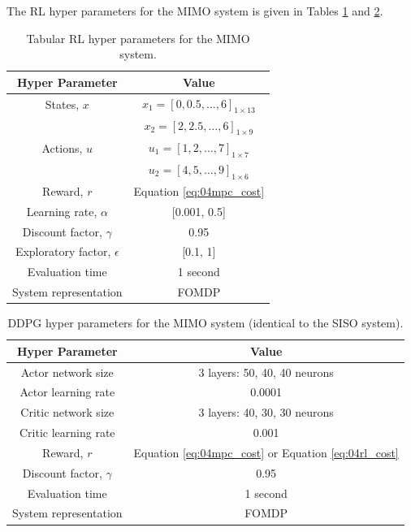 The RL hyper parameters for the MIMO system is given in Tables \ref{tab:04tab_rl_mimo} and \ref{tab:04deep_rl_mimo}.
\begin{table}[H]
\caption{Tabular RL hyper parameters for the MIMO system.}
\label{tab:04tab_rl_mimo}
\centering
\begin{tabular}{c|c}
\textbf{Hyper Parameter}     & \textbf{Value}  \\
\hline
States, $x$	             	& $x_1 = [0, 0.5, ..., 6]_{1 \times 13} $		 \\
        	             	& $x_2 = [2, 2.5, ..., 6]_{1 \times 9} $		 \\
Actions, $u$                & $u_1 = [1, 2, ..., 7]_{1 \times 7}$	         \\
                            & $u_2 = [4, 5, ..., 9]_{1 \times 6}$		\\
Reward, $r$	                & Equation \ref{eq:04mpc_cost}		\\
Learning rate, $\alpha$		& [0.001, 0.5]		 \\
Discount factor, $\gamma$      	& 0.95  \\
Exploratory factor, $\epsilon$             & [0.1, 1]  \\
Evaluation time                 & 1 second \\
System representation           & FOMDP \\
\end{tabular}
\end{table}

\begin{table}[H]
\caption{DDPG hyper parameters for the MIMO system (identical to the SISO system).}
\label{tab:04deep_rl_mimo}
\centering
\begin{tabular}{c|c}
\textbf{Hyper Parameter}     & \textbf{Value}  \\
\hline
Actor network size	             & 3 layers: 50, 40, 40 neurons		 \\
Actor learning rate              & 0.0001		\\
Critic network size	             & 3 layers: 40, 30, 30 neurons		\\
Critic learning rate       		 & 0.001		 \\
Reward, $r$	                     & Equation \ref{eq:04mpc_cost}	or Equation \ref{eq:04rl_cost}	\\
Discount factor, $\gamma$      	& 0.95  \\
Evaluation time                 & 1 second \\
System representation           & FOMDP \\
\end{tabular}
\end{table}

